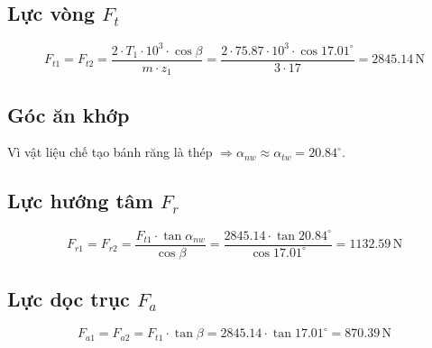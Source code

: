         \subsection{Lực vòng $F_t$}
            \begin{equation*}
                F_{t1} = F_{t2} = \frac{2 \cdot T_1 \cdot 10 ^3 \cdot \cos{\beta}}{m \cdot z_1} = \frac{2 \cdot 75.87 \cdot 10^3 \cdot \cos{17.01^\circ}}{3 \cdot 17} = 2845.14 \, \mathrm{N}
            \end{equation*}
        \subsection{Góc ăn khớp}
            \hspace*{0.6cm}Vì vật liệu chế tạo bánh răng là thép $\Rightarrow \alpha_{nw} \approx \alpha_{tw} = 20.84^\circ$.
        \subsection{Lực hướng tâm $F_r$}
            \begin{equation*}
                F_{r1} = F_{r2} = \frac{F_{t1} \cdot \tan{\alpha_{nw}}}{\cos{\beta}} = \frac{2845.14 \cdot \tan{20.84^\circ}}{\cos{17.01^\circ}} = 1132.59\, \mathrm{N}
            \end{equation*}
        \subsection{Lực dọc trục $F_a$}
            \begin{equation*}
                F_{a1} = F_{a2} = F_{t1} \cdot \tan{\beta} = 2845.14 \cdot \tan{17.01^\circ} = 870.39\, \mathrm{N}
            \end{equation*}
